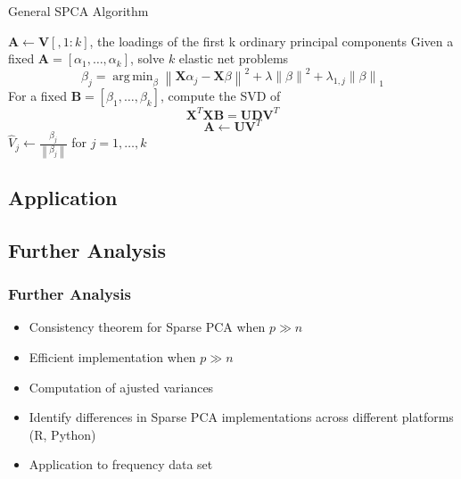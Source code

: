 \documentclass{beamer}
\theoremstyle{plain}
\theoremstyle{definition}
\newcommand{\mat}[1]{\mathbf{#1}}
\DeclareMathOperator*{\argmin}{arg\,min}
\newcommand{\norm}[1]{\left\lVert #1 \right\rVert}
\begin{document}
\begin{frame}
\begin{algorithm}[H]
  \scriptsize
    \caption{General SPCA Algorithm}
    \begin{algorithmic}[1]
        	\State $\mat A \gets \mat V[,1 \colon k]$, the loadings of the first k ordinary principal components
                \State Given a fixed $\mat A = [\alpha_1, \ldots, \alpha_k]$, solve $k$ elastic net problems $$\beta_j = \argmin_{\beta} \norm{\mat X \alpha_j - \mat X \beta}^{2} + \lambda \norm{\beta}^2 + \lambda_{1,j}\norm{\beta}_{1}$$
                \State For a fixed $\mat B = [\beta_1, \ldots, \beta_k]$, compute the SVD of $$\mat X^T \mat X \mat B = \mat U \mat D \mat V^T$$
                $$\mat A \gets \mat U \mat V^T$$
            \EndWhile
            \State $\hat{V}_j \gets \frac{\beta_j}{\norm{\beta_j}}$ for $j = 1, \ldots, k$
        \EndProcedure
    \end{algorithmic}
\end{algorithm} 
\end{frame}

\subsection{Application}
\begin{frame}
\end{frame}

\subsection{Further Analysis}
\begin{frame}
\frametitle{Further Analysis}
\begin{itemize}
\item Consistency theorem for Sparse PCA when $p \gg n$
\item Efficient implementation when $p \gg n$
\item Computation of ajusted variances
\item Identify differences in Sparse PCA implementations across different platforms (R, Python)
\item Application to frequency data set
\end{itemize}
\end{frame}


\end{document}
